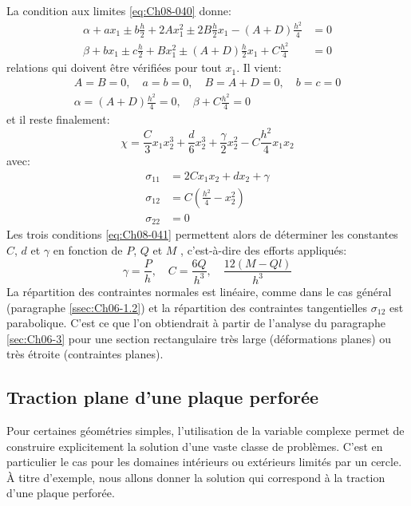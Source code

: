 La condition aux limites \eqref{eq:Ch08-040} donne: 
\begin{equation}
  \begin{aligned}
    \alpha +a x_1 \pm b \frac{h}{2} + 2 A x_1^2 \pm 2 B \frac{h}{2} x_1 - (A+D)\frac{h^2}{4} & = 0 \\
    \beta +b x_1 \pm c \frac{h}{2} + B x_1^2 \pm (A+D) \frac{h}{2} x_1 + C \frac{h^2}{4}&=0
  \end{aligned}
    \label{eq:Ch08-042}
\end{equation}
relations qui doivent être vérifiées pour tout $x_1$.
Il vient:
\begin{equation}
  \begin{aligned}
    A = B = 0, \quad a = b =0, \quad B = A+D =0, \quad b = c =0\\
    \alpha=(A+D)\frac{h^2}{4}=0, \quad \beta + C \frac{h^2}{4} =0
  \end{aligned}
    \label{eq:Ch08-043}
\end{equation}
et il reste finalement:
\begin{equation}
  \chi = \frac{C}{3} x_1 x_2^3 + \frac{d}{6} x_2^3 +\frac{\gamma}{2} x_2^2 - C\frac{h^2}{4} x_1 x_2
    \label{eq:Ch08-044}
\end{equation}
avec:
\begin{equation}
  \begin{aligned}
    \sigma_{11} & = 2 C x_1 x_2 + d x_2 + \gamma \\
    \sigma_{12} & = C (\frac{h^2}{4} - x_2^2) \\
    \sigma_{22} & = 0
  \end{aligned}
    \label{eq:Ch08-045}
\end{equation}
Les trois conditions \eqref{eq:Ch08-041} permettent alors de déterminer les constantes $C$, $d$ et $\gamma$ en fonction de $P$, $Q$ et $M$ , c'est-à-dire des efforts appliqués: 
\begin{equation}
  \gamma = \frac{P}{h}, \quad C = \frac{6Q}{h^3}, \quad \frac{12(M-Ql)}{h^3}
    \label{eq:Ch08-046}
\end{equation}
La répartition des contraintes normales est linéaire, comme dans le cas général (paragraphe \ref{ssec:Ch06-1.2}) et la répartition des contraintes tangentielles $\sigma_{12}$ est parabolique.
C'est ce que l'on obtiendrait à partir de l'analyse du paragraphe \ref{sec:Ch06-3} pour une section rectangulaire très large (déformations planes) ou très étroite (contraintes planes). 

\subsection{Traction plane d'une plaque perforée}\label{ssec:Ch08-2.2}
Pour certaines géométries simples, l'utilisation de la variable complexe permet de construire explicitement la solution d'une vaste classe de problèmes. 
C'est en particulier le cas pour les domaines intérieurs ou extérieurs limités par un cercle. 
À titre d'exemple, nous allons donner la solution qui correspond à la traction d'une plaque perforée. 

